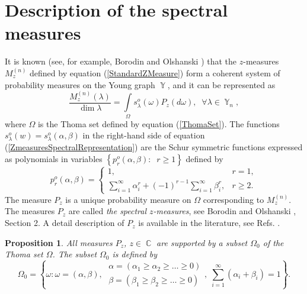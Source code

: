 \documentclass[12pt]{amsart}
\newtheorem{prop}[thm]{Proposition}
\theoremstyle{definition}
\numberwithin{equation}{section}
\DeclareMathOperator{\Y}{\mathbb{Y}}
\DeclareMathOperator{\C}{\mathbb{C}}
\begin{document}
\section{Description of the spectral measures}
It is known (see, for example, Borodin and Olshanski \cite{BorodinOlshanskiMarkov})
that the $z$-measures $M_z^{(n)}$ defined by equation (\ref{StandardZMeasure}) form
a coherent system of probability measures on the Young graph $\Y$, and it can be represented as
\begin{equation}\label{ZmeasuresSpectralRepresentation}
\frac{M_z^{(n)}(\lambda)}{\dim\lambda}=\int\limits_{\Omega}s_{\lambda}^{o}(\omega)P_z(d\omega),\;\;\forall\lambda\in\Y_n,
\end{equation}
where $\Omega$ is the Thoma set defined by equation (\ref{ThomaSet}).
The functions  $s_{\lambda}^{o}(w)=s_{\lambda}^{o}(\alpha,\beta)$  in the right-hand side of
equation (\ref{ZmeasuresSpectralRepresentation}) are the Schur symmetric functions expressed as polynomials in variables
$\left\{p_r^{o}(\alpha,\beta):\;\;r\geq 1\right\}$ defined by
\begin{equation}\label{proJack1}
p_r^{o}(\alpha,\beta)=\left\{
  \begin{array}{ll}
    1, & r=1,\\
    \sum\limits_{i=1}^{\infty}\alpha_i^r+(-1)^{r-1}\sum\limits_{i=1}^{\infty}\beta_i^r, &  r\geq 2.
  \end{array}
\right.
\end{equation}
The measure $P_z$ is a unique probability measure on $\Omega$ corresponding to $M_z^{(n)}$. The measures $P_z$ are called \textit{the spectral $z$-measures},
see Borodin and Olshanski \cite{BorodinOlshanskiLetters}, Section 2.
A detail description of $P_{z}$ is available in the literature,
see Refs. \cite{Borodin1,Borodin2,BorodinOlshanskiLetters,OlshanskiNato}.
\begin{prop}All measures $P_{z}$, $z\in\C$ are supported by a subset $\Omega_0$ of the Thoma set $\Omega$.
The subset $\Omega_0$ is defined by
\begin{equation}\label{Omegao}
\Omega_0=\left\{\omega: \omega=(\alpha,\beta),\;
\begin{array}{c}
\alpha=\left(\alpha_1\geq\alpha_2\geq\ldots\geq 0\right)\\
\beta=\left(\beta_1\geq\beta_2\geq\ldots\geq 0\right)                     \end{array},\;\sum\limits_{i=1}^{\infty}(\alpha_i+\beta_i)=1\right\}.
\end{equation}
\end{prop}
\end{document}
